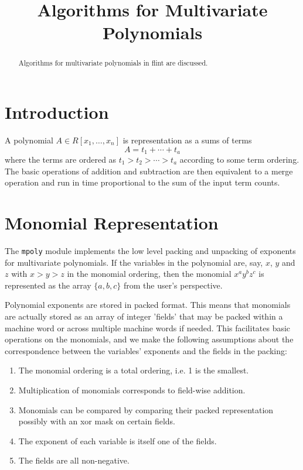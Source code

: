 \documentclass[11pt,reqno]{amsart}
\title{Algorithms for Multivariate Polynomials}
\author{}
\numberwithin{equation}{section}
\begin{document}
\begin{abstract}
Algorithms for multivariate polynomials in flint are discussed.
\end{abstract}


\maketitle

\section{Introduction}

A polynomial $A \in R[x_1,\dots,x_n]$ is representation as a sums of terms
\begin{equation*}
A = t_1 + \cdots + t_a
\end{equation*}
where the terms are ordered as $t_1 > t_2 > \cdots > t_a$ according to some term ordering. The basic operations of addition and subtraction are then equivalent to a merge operation and run in time proportional to the sum of the input term counts.


\section{Monomial Representation}

The {\tt mpoly} module implements the low level packing and unpacking of exponents
for multivariate polynomials. If the variables in the polynomial are, say,
$x$, $y$ and $z$ with $x > y > z$ in the monomial ordering, then the monomial
$x^a y^b z^c$ is represented as the array $\{a, b, c\}$ from the user's perspective.

Polynomial exponents are stored in packed format. This means that monomials are
actually stored as an array of integer 'fields' that may be packed within
a machine word or across multiple machine words if needed.
This facilitates basic operations on the monomials, and we make the following assumptions about
the correspondence between the variables' exponents and the
fields in the packing:

\begin{enumerate}
\item {The monomial ordering is a total ordering, i.e. 1 is the smallest.}
\item{Multiplication of monomials corresponds to field-wise addition.}
\item{Monomials can be compared by comparing their packed representation possibly with an xor mask on certain fields.}
\item{The exponent of each variable is itself one of the fields.}
\item{The fields are all non-negative.}
\end{enumerate}
\end{document}
